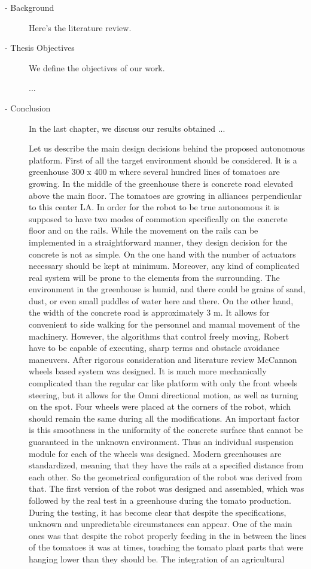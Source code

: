 \begin{description}
    \item[ - Background]
Here's the literature review.

    \item[ - Thesis Objectives]
We define the objectives of our work.

...

    \item[ - Conclusion]
In the last chapter, we discuss our results obtained ...


Let us describe the main design decisions behind the proposed autonomous platform. First of all the target environment should be considered. It is a greenhouse 300 x 400 m where several hundred lines of tomatoes are growing. In the middle of the greenhouse there is concrete road elevated above the main floor. The tomatoes are growing in alliances perpendicular to this center LA. In order for the robot to be true autonomous it is supposed to have two modes of commotion specifically on the concrete floor and on the rails. While the movement on the rails can be implemented in a straightforward manner, they design decision for the concrete is not as simple. On the one hand with the number of actuators necessary should be kept at minimum. Moreover, any kind of complicated real system will be prone to the elements from the surrounding. The environment in the greenhouse is humid, and there could be grains of sand, dust, or even small puddles of water here and there. On the other hand, the width of the concrete road is approximately 3 m. It allows for convenient to side walking for the personnel and manual movement of the machinery. However, the algorithms that control freely moving, Robert have to be capable of executing, sharp terms and obstacle avoidance maneuvers. After rigorous consideration and literature review McCannon wheels based system was designed. It is much more mechanically complicated than the regular car like platform with only the front wheels steering, but it allows for the Omni directional motion, as well as turning on the spot. Four wheels were placed at the corners of the robot, which should remain the same during all the modifications. An important factor is this smoothness in the uniformity of the concrete surface that cannot be guaranteed in the unknown environment. Thus an individual suspension module for each of the wheels was designed. Modern greenhouses are standardized, meaning that they have the rails at a specified distance from each other. So the geometrical configuration of the robot was derived from that. The first version of the robot was designed and assembled, which was followed by the real test in a greenhouse during the tomato production. During the testing, it has become clear that despite the specifications, unknown and unpredictable circumstances can appear. One of the main ones was that despite the robot properly feeding in the in between the lines of the tomatoes it was at times, touching the tomato plant parts that were hanging lower than they should be. The integration of an agricultural 
\end{description}
